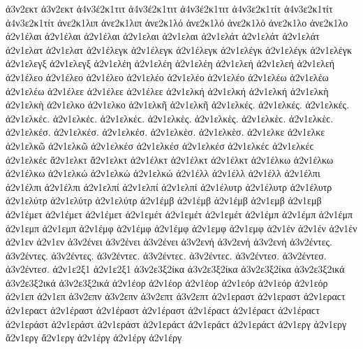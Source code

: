 {ἀ3ν2εκτ ἀ3ν2εκτ   %
ἀ4ν3έ2κ1τιτ ἀ4ν3έ2κ1τιτ ἀ4ν3έ2κ1τιτ   %
ἀ4ν3ε2κ1τίτ ἀ4ν3ε2κ1τίτ ἀ4ν3ε2κ1τίτ 
ἀνε2κ1λιπ ἀνε2κ1λιπ   %
ἀνε2κ1λό ἀνε2κ1λό ἀνε2κ1λό   %
ἀνε2κ1λο ἀνε2κ1λο 
ἀ2ν1έλαι ἀ2ν1έλαι ἀ2ν1έλαι   %
ἀ2ν1ελαι ἀ2ν1ελαι 
ἀ2ν1ελάτ ἀ2ν1ελάτ ἀ2ν1ελάτ   %
ἀ2ν1ελατ ἀ2ν1ελατ 
ἀ2ν1έλεγκ ἀ2ν1έλεγκ ἀ2ν1έλεγκ   %
ἀ2ν1ελέγκ ἀ2ν1ελέγκ ἀ2ν1ελέγκ 
ἀ2ν1ελεγξ ἀ2ν1ελεγξ   %
ἀ2ν1ελέη ἀ2ν1ελέη ἀ2ν1ελέη   %
ἀ2ν1ελεή ἀ2ν1ελεή ἀ2ν1ελεή 
ἀ2ν1έλεο ἀ2ν1έλεο ἀ2ν1έλεο   %
ἀ2ν1ελέο ἀ2ν1ελέο ἀ2ν1ελέο 
ἀ2ν1ελέω ἀ2ν1ελέω ἀ2ν1ελέω 
ἀ2ν1έλεε ἀ2ν1έλεε ἀ2ν1έλεε 
ἀ2ν1ελκή ἀ2ν1ελκή ἀ2ν1ελκή   %
ἀ2ν1ελκὴ ἀ2ν1ελκὴ 
ἀ2ν1ελκο ἀ2ν1ελκο 
ἀ2ν1ελκῆ ἀ2ν1ελκῆ 
ἀ2ν1ελκές. ἀ2ν1ελκές. ἀ2ν1ελκές. ἀ2ν1ελκέϲ. ἀ2ν1ελκέϲ. ἀ2ν1ελκέϲ. 
ἀ2ν1ελκὲς. ἀ2ν1ελκὲς. ἀ2ν1ελκὲϲ. ἀ2ν1ελκὲϲ. 
ἀ2ν1ελκέσ. ἀ2ν1ελκέσ. ἀ2ν1ελκέσ. 
ἀ2ν1ελκὲσ. ἀ2ν1ελκὲσ. 
ἀ2ν1ελκε ἀ2ν1ελκε 
ἀ2ν1ελκῶ ἀ2ν1ελκῶ 
ἀ2ν1ελκέσ ἀ2ν1ελκέσ ἀ2ν1ελκέσ ἀ2ν1ελκέϲ ἀ2ν1ελκέϲ ἀ2ν1ελκέϲ 
ἄ2ν1ελκτ ἄ2ν1ελκτ   %
ἀ2ν1έλκτ ἀ2ν1έλκτ ἀ2ν1έλκτ 
ἀ2ν1έλκω ἀ2ν1έλκω ἀ2ν1έλκω   %
ἀ2ν1ελκώ ἀ2ν1ελκώ ἀ2ν1ελκώ 
ἀ2ν1έλλ ἀ2ν1έλλ ἀ2ν1έλλ   %
ἀ2ν1έλπι ἀ2ν1έλπι ἀ2ν1έλπι   %
ἀ2ν1ελπί ἀ2ν1ελπί ἀ2ν1ελπί 
ἀ2ν1έλυτρ ἀ2ν1έλυτρ ἀ2ν1έλυτρ   %
ἀ2ν1ελύτρ ἀ2ν1ελύτρ ἀ2ν1ελύτρ 
ἀ2ν1έμβ ἀ2ν1έμβ ἀ2ν1έμβ   %
ἀ2ν1εμβ ἀ2ν1εμβ 
ἀ2ν1έμετ ἀ2ν1έμετ ἀ2ν1έμετ   %
ἀ2ν1εμέτ ἀ2ν1εμέτ ἀ2ν1εμέτ 
ἀ2ν1έμπ ἀ2ν1έμπ ἀ2ν1έμπ   %
ἀ2ν1εμπ ἀ2ν1εμπ 
ἀ2ν1έμφ ἀ2ν1έμφ ἀ2ν1έμφ   %
ἀ2ν1εμφ ἀ2ν1εμφ 
ἀ2ν1έν ἀ2ν1έν ἀ2ν1έν   %
ἀ2ν1εν ἀ2ν1εν 
ἀ3ν2ένει ἀ3ν2ένει ἀ3ν2ένει   %
ἀ3ν2ενή ἀ3ν2ενή ἀ3ν2ενή   %
ἀ3ν2έντες. ἀ3ν2έντες. ἀ3ν2έντες. ἀ3ν2έντεϲ. ἀ3ν2έντεϲ. ἀ3ν2έντεϲ.   %
ἀ3ν2έντεσ. ἀ3ν2έντεσ. ἀ3ν2έντεσ. 
ἀ2ν1ε2ξ1 ἀ2ν1ε2ξ1   %
ἀ3ν2ε3ξ2ίκα ἀ3ν2ε3ξ2ίκα ἀ3ν2ε3ξ2ίκα   %
ἀ3ν2ε3ξ2ικά ἀ3ν2ε3ξ2ικά ἀ3ν2ε3ξ2ικά 
ἀ2ν1έορ ἀ2ν1έορ ἀ2ν1έορ   %
ἀ2ν1εόρ ἀ2ν1εόρ ἀ2ν1εόρ 
ἀ2ν1επ ἀ2ν1επ   %
ἀ3ν2επν ἀ3ν2επν   %
ἀ3ν2επτ ἀ3ν2επτ   %
ἀ2ν1εραστ ἀ2ν1εραστ ἀ2ν1εραϲτ ἀ2ν1εραϲτ   %
ἀ2ν1έραστ ἀ2ν1έραστ ἀ2ν1έραστ ἀ2ν1έραϲτ ἀ2ν1έραϲτ ἀ2ν1έραϲτ   %
ἀ2ν1εράστ ἀ2ν1εράστ ἀ2ν1εράστ ἀ2ν1εράϲτ ἀ2ν1εράϲτ ἀ2ν1εράϲτ 
ἀ2ν1εργ ἀ2ν1εργ   %
ἄ2ν1εργ ἄ2ν1εργ   %
ἀ2ν1έργ ἀ2ν1έργ ἀ2ν1έργ 
}
